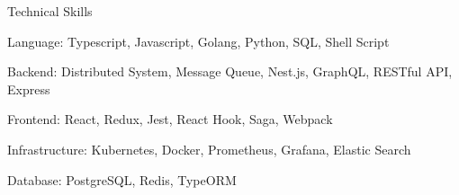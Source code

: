 \documentclass[]{mcdowellcv}
\begin{document}
	\makeheader

	\begin{cvsection}{Technical Skills}
		\begin{cvsubsection}{}{}{}	
			\begin{description}
			\item Language: Typescript, Javascript, Golang, Python, SQL, Shell Script
			\item Backend: Distributed System, Message Queue, Nest.js, GraphQL, RESTful API, Express
			\item Frontend: React, Redux, Jest, React Hook, Saga, Webpack
			\item Infrastructure: Kubernetes, Docker, Prometheus, Grafana, Elastic Search
			\item Database: PostgreSQL, Redis, TypeORM
			\end{description}
		\end{cvsubsection}
	\end{cvsection}	
\end{document}
